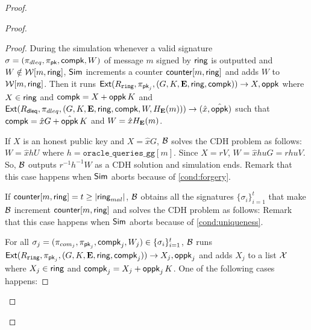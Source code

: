 \begin{proof}
\begin{proof}
\begin{proof}
			During the simulation whenever a valid signature $ \sigma = (\pi_{dleq},\pi_{\mathsf{pk}},\mathsf{compk},W) $ of message $ m $ signed by $ \mathsf{ring} $ is outputted and $ W \notin \mathcal{W}[m, \mathsf{ring}] $, $ \mathsf{Sim} $ increments a counter $ \mathsf{counter}[m,\mathsf{ring}] $ and adds $ W $ to $ \mathcal{W}[m,\mathsf{ring}] $.
			Then it runs $ \mathsf{Ext}(R_{\mathtt{ring}},\pi_{\mathsf{pk}_j},(G,K,{\mathbf{E}},\mathsf{ring}, \mathsf{compk}) ) \rightarrow X, \mathsf{oppk}$ where $ X\in \mathsf{ring} $ and $ \mathsf{compk} = X + \mathsf{oppk} \, K $ and $ \mathsf{Ext}(R_{\mathsf{dleq}},\pi_{dleq},(G,K,{\mathbf{E}},\mathsf{ring}, \mathsf{compk},W,H_{\mathbf{E}}(m))) \rightarrow (\hat{x},\hat{\mathsf{oppk}} )$ such that $ \mathsf{compk} = \hat{x}G + \hat{\mathsf{oppk}} \, K $ and $ W = \hat{x} H_{\mathbf{E}}(m) $. 
			
			If $ X  $ is an honest public key and $ X = \hat{x}G $, $ \mathcal{B} $ solves the CDH problem as follows: $ W = \hat{x} h U $ where $ h = \mathtt{oracle\_queries\_gg}[m] $. Since $ X = r V $, $ W = \hat{x}huG =rhuV $. So, $ \mathcal{B} $ outputs $ r^{-1}h^{-1}W $ as a CDH solution and simulation ends. Remark that this case happens when $ \mathsf{Sim} $ aborts because of \ref{cond:forgery}.
			
			If $  \mathsf{counter}[m,\mathsf{ring}] = t \geq |\mathsf{ring}_{mal}| $, $ \mathcal{B} $ obtains all the signatures $ \{\sigma_i\}_{i =1}^t $ that make $ \mathcal{B} $ increment $ \mathsf{counter}[m,\mathsf{ring}] $ and solves the CDH problem as follows: Remark that this case happens when $ \mathsf{Sim} $ aborts because of \ref{cond:uniqueness}.
			
			For all $ \sigma_j = (\pi_{com_j},\pi_{\mathsf{pk}_j},\mathsf{compk}_j,W_j) \in \{\sigma_i\}_{i =1}^t $, $ \mathcal{B} $ runs $ \mathsf{Ext}(R_{\mathtt{ring}},\pi_{\mathsf{pk}_j},(G,K,{\mathbf{E}},\mathsf{ring}, \mathsf{compk}_j) ) \rightarrow X_j, \mathsf{oppk}_j$ and adds $ X_j $ to a list $ {\mathcal{X}}  $ where $ X_j\in \mathsf{ring} $ and $ \mathsf{compk}_j = X_j + \mathsf{oppk}_j \,K $. One of the following cases happens:
			

\end{proof}
\end{proof}
\end{proof}
